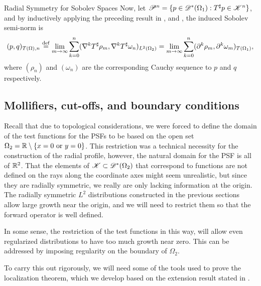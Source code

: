\begin{chapter}{Radial Symmetry for Sobolev Spaces}
Now, let $\mathscr P^n = \{p \in \mathscr D^*(\Omega_1): T^\sharp p \in \mathscr K^n\}$, and by inductively applying the preceding result in , and , the induced Sobolev semi-norm is
\begin{equation}
  (p,q)_{T(\Omega),n} \stackrel{\rm def}{=} \lim_{m\to \infty} \sum_{k=0}^n(\nabla^k T^\sharp \rho_m, \nabla^k T^\sharp \omega_n)_{L^2(\Omega_2)} = \lim_{m\to \infty} \sum_{k=0}^n(\partial^k \rho_m,\partial^k \omega_m)_{T(\Omega_1)},
\end{equation}
where $(\rho_n)$ and $(\omega_n)$ are the corresponding Cauchy sequence to $p$ and $q$ respectively.


\begin{com}
\subsection{Mollifiers, cut-offs, and boundary conditions}

Recall that due to topological considerations, we were forced to define the domain of the test functions for the PSFs to be based on the open set $\Omega_2 = \mathbb R\setminus \{x=0\text{ or }y=0\}$. 
This restriction was a technical necessity for the construction of the radial profile, however, the natural domain for the PSF is all of $\mathbb R^2$.
That the elements of $\mathscr K \subset \mathscr D^*(\Omega_2)$ that correspond to functions are not defined on the rays along the coordinate axes might seem unrealistic, but since they are radially symmetric, we really are only lacking information at the origin.
The radially symmetric $L^2$ distributions constructed in the previous sections allow large growth near the origin, and we will need to restrict them so that the forward operator is well defined.

In some sense, the restriction of the test functions in this way, will allow even regularized distributions to have too much growth near zero.
This can be addressed by imposing regularity on the boundary of $\Omega_2$. 

To carry this out rigorously, we will need some of the tools used to prove the localization theorem, which we develop based on the extension result stated in .


\end{com}
\end{chapter}
